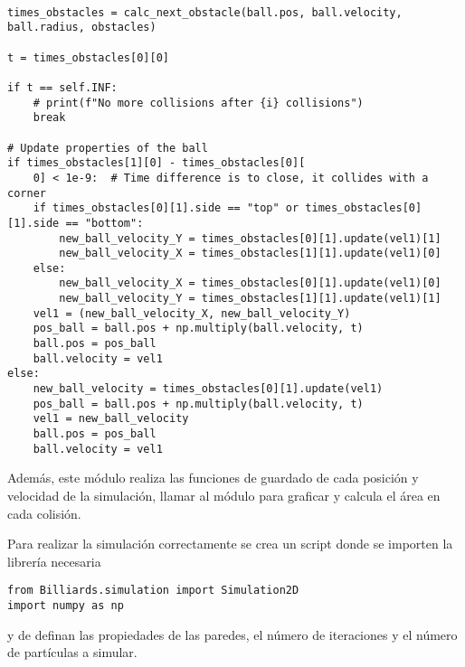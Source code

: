 \begin{lstlisting}[breaklines]

times_obstacles = calc_next_obstacle(ball.pos, ball.velocity, ball.radius, obstacles)

t = times_obstacles[0][0]

if t == self.INF:
    # print(f"No more collisions after {i} collisions")
    break

# Update properties of the ball
if times_obstacles[1][0] - times_obstacles[0][
    0] < 1e-9:  # Time difference is to close, it collides with a corner
    if times_obstacles[0][1].side == "top" or times_obstacles[0][1].side == "bottom":
        new_ball_velocity_Y = times_obstacles[0][1].update(vel1)[1]
        new_ball_velocity_X = times_obstacles[1][1].update(vel1)[0]
    else:
        new_ball_velocity_X = times_obstacles[0][1].update(vel1)[0]
        new_ball_velocity_Y = times_obstacles[1][1].update(vel1)[1]
    vel1 = (new_ball_velocity_X, new_ball_velocity_Y)
    pos_ball = ball.pos + np.multiply(ball.velocity, t)
    ball.pos = pos_ball
    ball.velocity = vel1
else:
    new_ball_velocity = times_obstacles[0][1].update(vel1)
    pos_ball = ball.pos + np.multiply(ball.velocity, t)
    vel1 = new_ball_velocity
    ball.pos = pos_ball
    ball.velocity = vel1
\end{lstlisting}

Además, este módulo realiza las funciones de guardado de cada posición y velocidad de la simulación, llamar al módulo para graficar y calcula el área en cada colisión.

\vspace{3mm}

Para realizar la simulación correctamente se crea un script donde se importen la librería necesaria

\begin{lstlisting}[breaklines]
from Billiards.simulation import Simulation2D
import numpy as np
\end{lstlisting}

y de definan las propiedades de las paredes, el número de iteraciones y el número de partículas a simular.